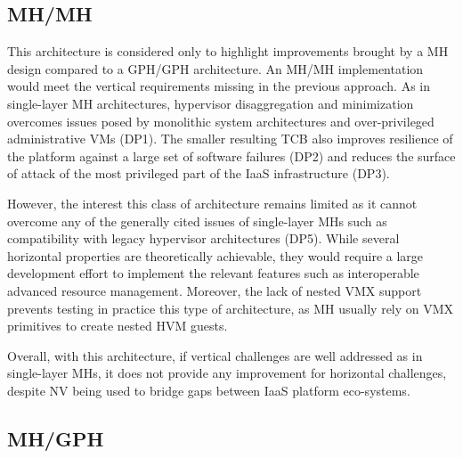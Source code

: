 \documentclass{sig-alternate}
\begin{document}

\subsection{MH/MH}

\noindent This architecture is considered only to highlight improvements brought by a MH design compared to a GPH/GPH architecture. An MH/MH implementation would meet the vertical requirements missing in the previous approach. 
As in single-layer MH architectures, hypervisor disaggregation and minimization overcomes issues posed by monolithic system architectures and over-privileged administrative VMs (DP1). The smaller resulting TCB also improves resilience of the platform against a large set of software failures (DP2) and reduces the surface of attack of the most privileged part of the IaaS infrastructure (DP3). 

However, the interest this class of architecture remains limited as it cannot overcome any of the generally cited issues of single-layer MHs such as compatibility with legacy hypervisor architectures (DP5). While several horizontal properties are theoretically achievable, they would require a large development effort to implement the relevant features such as interoperable advanced resource management. Moreover, the lack of nested VMX support prevents testing in practice this type of architecture, as MH usually rely on VMX primitives to create nested HVM guests.

Overall, with this architecture, if vertical challenges are well addressed as in single-layer MHs, it does not provide any improvement for horizontal challenges, despite NV being used to bridge gaps between IaaS platform eco-systems.

\subsection{MH/GPH}
\label{par:mog}
\end{document}
